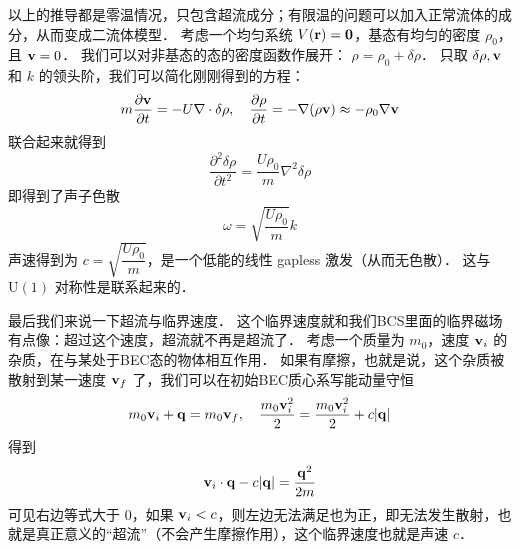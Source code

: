 以上的推导都是零温情况，只包含超流成分；有限温的问题可以加入正常流体的成分，从而变成二流体模型． 考虑一个均匀系统 $V(\bf r) = 0$，基态有均匀的密度 $\rho_0$，且 ${\bf v} = 0$． 我们可以对非基态的态的密度函数作展开： $\rho = \rho_0+\delta\rho$． 只取 $\delta\rho,{\bf v}$ 和 $k$ 的领头阶，我们可以简化刚刚得到的方程：
\begin{equation}
m\frac{\partial\bf v}{\partial t} = -U\nabla\cdot\delta\rho,\quad \frac{\partial\rho}{\partial t} = -\nabla(\rho{\bf v}) \approx-\rho_0\nabla\bf v
\end{equation}
联合起来就得到
\begin{equation}
\frac{\partial^2\delta\rho}{\partial t^2} = \frac{U\rho_0}{m}\nabla^2\delta\rho
\end{equation}
即得到了声子色散
\begin{equation}
\omega = \sqrt{\frac{U\rho_0}{m}}k
\end{equation}
声速得到为 $c=\sqrt{\dfrac{U\rho_0}{m}}$，是一个低能的线性 gapless 激发（从而无色散）． 这与 $\text{U}(1)$ 对称性是联系起来的．

最后我们来说一下超流与临界速度． 这个临界速度就和我们BCS里面的临界磁场有点像：超过这个速度，超流就不再是超流了．
考虑一个质量为 $m_0$，速度 ${\bf v}_i$ 的杂质，在与某处于BEC态的物体相互作用． 如果有摩擦，也就是说，这个杂质被散射到某一速度 ${\bf v}_f$ 了，我们可以在初始BEC质心系写能动量守恒
\begin{equation}
m_0{\bf v}_i + {\bf q} = m_0{\bf v}_f,\quad \frac{m_0{\bf v}_i^2}{2} = \frac{m_0{\bf v}_i^2}{2} + c|{\bf q}|
\end{equation}
得到
\begin{equation}
{\bf v}_i\cdot{\bf q}-c|{\bf q}| = \frac{{\bf q}^2}{2m}
\end{equation}
可见右边等式大于 $0$，如果 ${\bf v}_i<c$，则左边无法满足也为正，即无法发生散射，也就是真正意义的“超流”（不会产生摩擦作用），这个临界速度也就是声速 $c$．
